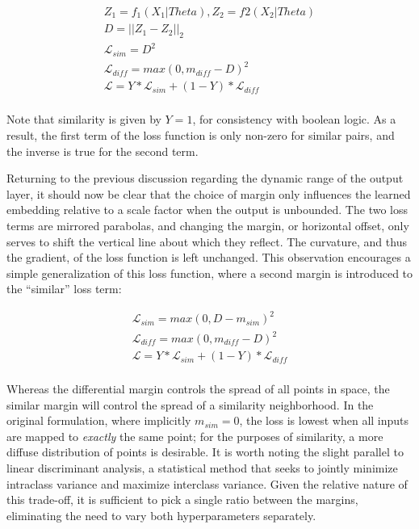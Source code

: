 \begin{align*}
Z_1 = f_1(X_1 | Theta), Z_2 = f2(X_2 | Theta)\\
D = || Z_1 - Z_2 ||_2\\
\mathcal{L}_{sim} = D^2\\
\mathcal{L}_{diff} = max(0, m_{diff} - D)^2\\
\mathcal{L} = Y * \mathcal{L}_{sim} + (1 - Y) * \mathcal{L}_{diff} \\
\end{align*}

\noindent Note that similarity is given by $Y=1$, for consistency with boolean logic.
As a result, the first term of the loss function is only non-zero for similar pairs, and the inverse is true for the second term.

Returning to the previous discussion regarding the dynamic range of the output layer, it should now be clear that the choice of margin only influences the learned embedding relative to a scale factor when the output is unbounded.
The two loss terms are mirrored parabolas, and changing the margin, or horizontal offset, only serves to shift the vertical line about which they reflect.
The curvature, and thus the gradient, of the loss function is left unchanged.
This observation encourages a simple generalization of this loss function, where a second margin is introduced to the ``similar'' loss term:

\begin{align*}
\mathcal{L}_{sim} = max(0, D - m_{sim})^2\\
\mathcal{L}_{diff} = max(0, m_{diff} - D)^2\\
\mathcal{L} = Y * \mathcal{L}_{sim} + (1 - Y) * \mathcal{L}_{diff} \\
\end{align*}

Whereas the differential margin controls the spread of all points in space, the similar margin will control the spread of a similarity neighborhood.
In the original formulation, where implicitly $m_{sim} = 0$, the loss is lowest when all inputs are mapped to \emph{exactly} the same point; for the purposes of similarity, a more diffuse distribution of points is desirable.
It is worth noting the slight parallel to linear discriminant analysis, a statistical method that seeks to jointly minimize intraclass variance and maximize interclass variance.
Given the relative nature of this trade-off, it is sufficient to pick a single ratio between the margins, eliminating the need to vary both hyperparameters separately.


